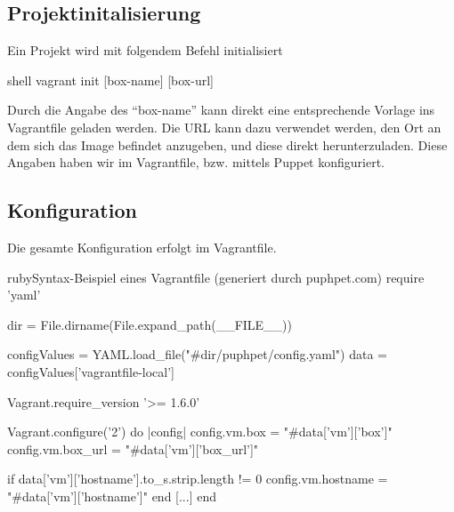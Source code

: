 \subsection{Projektinitalisierung}

Ein Projekt wird mit folgendem Befehl initialisiert
\begin{src}{shell}
vagrant init [box-name] [box-url]
\end{src}

 Durch die Angabe des ``box-name'' kann direkt eine entsprechende Vorlage ins Vagrantfile geladen werden. Die URL kann dazu verwendet werden, den Ort an dem sich das Image befindet anzugeben, und diese direkt herunterzuladen. Diese Angaben haben wir im Vagrantfile, bzw. mittels Puppet konfiguriert.


\subsection{Konfiguration}
Die gesamte Konfiguration erfolgt im Vagrantfile. 
\begin{srclst}{ruby}{Syntax-Beispiel eines Vagrantfile (generiert durch puphpet.com)}
require 'yaml'

dir = File.dirname(File.expand_path(__FILE__))

configValues = YAML.load_file("#{dir}/puphpet/config.yaml")
data         = configValues['vagrantfile-local']

Vagrant.require_version '>= 1.6.0'

Vagrant.configure('2') do |config|
  config.vm.box     = "#{data['vm']['box']}"
  config.vm.box_url = "#{data['vm']['box_url']}"

  if data['vm']['hostname'].to_s.strip.length != 0
    config.vm.hostname = "#{data['vm']['hostname']}"
  end
  [...]
end
\end{srclst}

